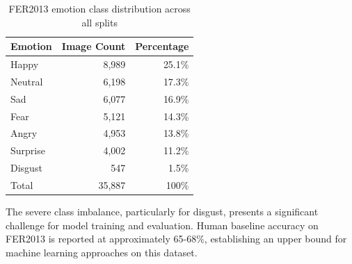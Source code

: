 \documentclass[12pt,a4paper]{article}
\begin{document}
\begin{table}[h!]
\centering
\begin{tabular}{lrr}
\toprule
Emotion & Image Count & Percentage \\  
\midrule
Happy & 8,989 & 25.1\% \\
Neutral & 6,198 & 17.3\% \\
Sad & 6,077 & 16.9\% \\
Fear & 5,121 & 14.3\% \\
Angry & 4,953 & 13.8\% \\
Surprise & 4,002 & 11.2\% \\
Disgust & 547 & 1.5\% \\
\midrule
Total & 35,887 & 100\% \\
\bottomrule
\end{tabular}
\caption{FER2013 emotion class distribution across all splits}
\label{tab:class_distribution}
\end{table}

The severe class imbalance, particularly for disgust, presents a significant challenge for model training and evaluation. Human baseline accuracy on FER2013 is reported at approximately 65-68\%, establishing an upper bound for machine learning approaches on this dataset.
\end{document}
